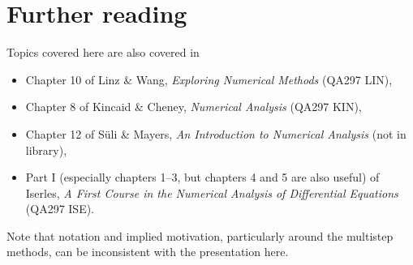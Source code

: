 \section*{Further reading}

Topics covered here are also covered in
\begin{itemize}
\item Chapter 10 of Linz \& Wang, \textit{Exploring Numerical Methods}
  (QA297 LIN),
\item Chapter 8 of Kincaid \& Cheney, \textit{Numerical Analysis}
  (QA297 KIN),
\item Chapter 12 of S{\"u}li \& Mayers, \textit{An Introduction to
    Numerical Analysis} (not in library),
\item Part I (especially chapters 1--3, but chapters 4 and 5 are also
  useful) of Iserles, \textit{A First Course in the Numerical Analysis
    of Differential Equations} (QA297 ISE).
\end{itemize}
Note that notation and implied motivation, particularly around the
multistep methods, can be inconsistent with the presentation here.
